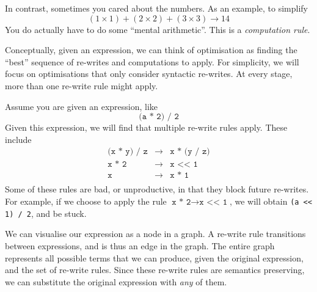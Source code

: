 In contrast, sometimes you cared about the numbers. As an example, to simplify 
\[(1 \times 1) + (2 \times 2) + (3 \times 3) \to 14\]
You do actually have to do some ``mental arithmetic''. This is a \textit{computation rule}. 

Conceptually, given an expression, we can think of optimisation as finding the ``best'' sequence of re-writes and computations to apply. For simplicity, we will focus on optimisations that only consider syntactic re-writes. At every stage, more than one re-write rule might apply. 

Assume you are given an expression, like
\[\texttt{(a * 2) / 2} \]
Given this expression, we will find that multiple re-write rules apply. These include
\[\begin{array}{rcl}
     \texttt{(x * y) / z} & \to & \texttt{x * (y / z)}  \\
     \texttt{x * 2} & \to & \texttt{x << 1}  \\ 
     \texttt{x} & \to & \texttt{x * 1}  \\ 
\end{array}\]
Some of these rules are bad, or unproductive, in that they block future re-writes. For example, if we choose to apply the rule $\texttt{x * 2} \to \texttt{x << 1}$, we will obtain \texttt{(a << 1) / 2}, and be stuck. 

We can visualise our expression as a node in a graph. A re-write rule transitions between expressions, and is thus an edge in the graph. The entire graph represents all possible terms that we can produce, given the original expression, and the set of re-write rules. Since these re-write rules are semantics preserving, we can substitute the original expression with \textit{any} of them. 

\begin{center}
\end{center}

